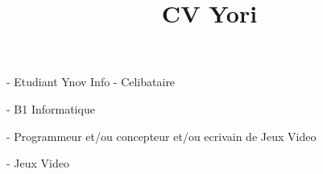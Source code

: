 \documentclass[12pt,oneside,a4paper]{article}
\begin{document}
\title{CV Yori}

\setcounter{Etat Civil}{2}
- Etudiant Ynov Info
- Celibataire


\setcounter{Etudes}{1}
- B1 Informatique

\setcounter{Projection dans 6mois}{1}
- Programmeur et/ou concepteur et/ou ecrivain de Jeux Video

\setcounter{Passion/Hobies}{1}
- Jeux Video
\end{document}
